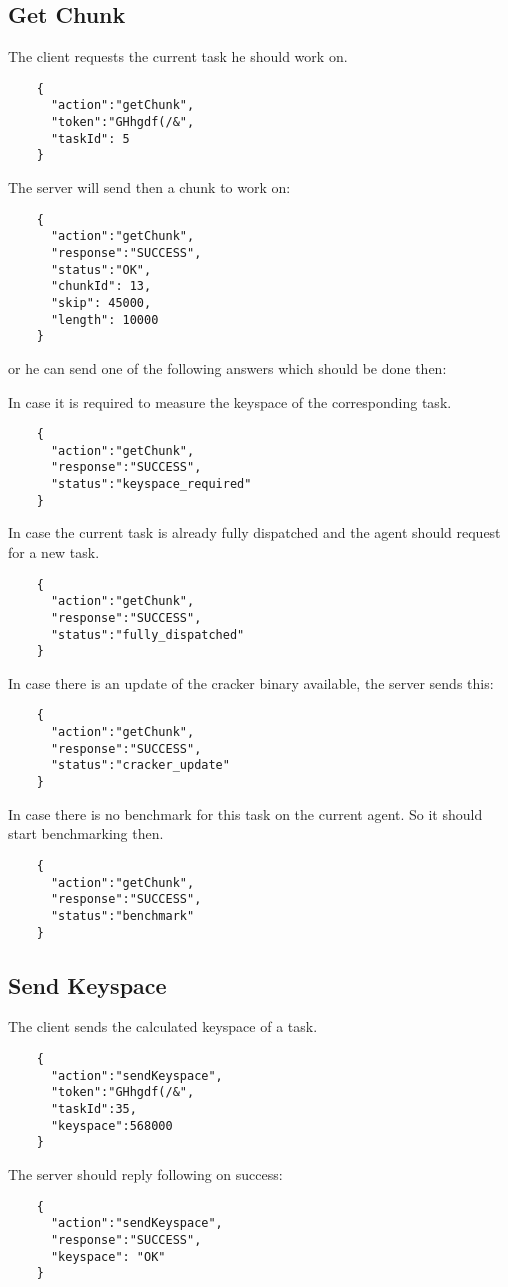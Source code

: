 \documentclass{article}
\begin{document}
	\subsection*{Get Chunk}
	The client requests the current task he should work on.
	\begin{verbatim}
	{
	  "action":"getChunk", 
	  "token":"GHhgdf(/&",
	  "taskId": 5
	}
	\end{verbatim}
	The server will send then a chunk to work on:
	\begin{verbatim}
	{
	  "action":"getChunk",
	  "response":"SUCCESS",
	  "status":"OK",
	  "chunkId": 13,
	  "skip": 45000,
	  "length": 10000
	}
	\end{verbatim}
	or he can send one of the following answers which should be done then:
	
	In case it is required to measure the keyspace of the corresponding task.
	\begin{verbatim}
	{
	  "action":"getChunk",
	  "response":"SUCCESS",
	  "status":"keyspace_required"
	}
	\end{verbatim}
	
	In case the current task is already fully dispatched and the agent should request for a new task.
	\begin{verbatim}
	{
	  "action":"getChunk",
	  "response":"SUCCESS",
	  "status":"fully_dispatched"
	}
	\end{verbatim}
	
	In case there is an update of the cracker binary available, the server sends this:
	\begin{verbatim}
	{
	  "action":"getChunk",
	  "response":"SUCCESS",
	  "status":"cracker_update"
	}
	\end{verbatim}
	
	In case there is no benchmark for this task on the current agent. So it should start benchmarking then.
	\begin{verbatim}
	{
	  "action":"getChunk",
	  "response":"SUCCESS",
	  "status":"benchmark"
	}
	\end{verbatim}
	
	
	\subsection*{Send Keyspace}
	The client sends the calculated keyspace of a task.
	\begin{verbatim}
	{
	  "action":"sendKeyspace",
	  "token":"GHhgdf(/&",
	  "taskId":35,
	  "keyspace":568000
	}
	\end{verbatim}
	The server should reply following on success:
	\begin{verbatim}
	{
	  "action":"sendKeyspace",
	  "response":"SUCCESS",
	  "keyspace": "OK"
	}
	\end{verbatim}
	
\end{document}
